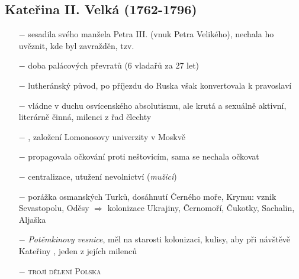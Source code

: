 \documentclass{article}
\begin{document}
\subsection*{Kateřina II. Velká (1762-1796)}
\begin{itemize}
    \vspace{-0.5em}
    \setlength\itemsep{0.15em}
    \item[$-$] sesadila svého manžela Petra III. (vnuk Petra Velikého), nechala ho uvěznit, kde byl zavražděn, tzv. 
    \item[$-$] doba palácových převratů (6 vladařů za 27 let)
    \item[$-$] lutheránský původ, po příjezdu do Ruska však konvertovala k pravoslaví
    \item[$-$] vládne v duchu osvícenského absolutismu, ale krutá a sexuálně aktivní, literárně činná, milenci z řad člechty
    \item[$-$] , založení Lomonosovy univerzity v Moskvě
    \item[$-$] propagovala očkování proti neštovicím, sama se nechala očkovat
    \item[$-$] centralizace, utužení nevolnictví (\textit{mužici})
    \item[$-$] porážka osmanských Turků, dosáhnutí Černého moře, Krymu: vznik Sevastopolu, Oděsy $\Rightarrow$ kolonizace Ukrajiny, Černomoří, Čukotky, Sachalin, Aljaška
    \item[$-$] \textit{Potěmkinovy vesnice}, měl na starosti kolonizaci, kulisy, aby při návštěvě Kateřiny , jeden z jejích milenců
    \item[$-$] \textsc{trojí dělení Polska}
\end{itemize}
\end{document}
